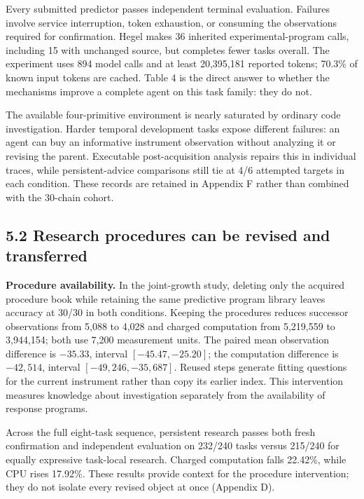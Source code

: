 \documentclass[11pt,a4paper]{article}
\begin{document}
Every submitted predictor passes independent terminal evaluation. Failures involve service interruption, token exhaustion, or consuming the observations required for confirmation. Hegel makes 36 inherited experimental-program calls, including 15 with unchanged source, but completes fewer tasks overall. The experiment uses 894 model calls and at least 20,395,181 reported tokens; 70.3\% of known input tokens are cached. Table 4 is the direct answer to whether the mechanisms improve a complete agent on this task family: they do not.


The available four-primitive environment is nearly saturated by ordinary code investigation. Harder temporal development tasks expose different failures: an agent can buy an informative instrument observation without analyzing it or revising the parent. Executable post-acquisition analysis repairs this in individual traces, while persistent-advice comparisons still tie at 4/6 attempted targets in each condition. These records are retained in Appendix F rather than combined with the 30-chain cohort.


\subsection*{5.2 Research procedures can be revised and transferred}

\textbf{Procedure availability.} In the joint-growth study, deleting only the acquired procedure book while retaining the same predictive program library leaves accuracy at 30/30 in both conditions. Keeping the procedures reduces successor observations from 5,088 to 4,028 and charged computation from 5,219,559 to 3,944,154; both use 7,200 measurement units. The paired mean observation difference is \(-35.33\), interval \([-45.47,-25.20]\); the computation difference is \(-42{,}514\), interval \([-49{,}246,-35{,}687]\). Reused steps generate fitting questions for the current instrument rather than copy its earlier index. This intervention measures knowledge about investigation separately from the availability of response programs.


Across the full eight-task sequence, persistent research passes both fresh confirmation and independent evaluation on 232/240 tasks versus 215/240 for equally expressive task-local research. Charged computation falls 22.42\%, while CPU rises 17.92\%. These results provide context for the procedure intervention; they do not isolate every revised object at once (Appendix D).
\end{document}
